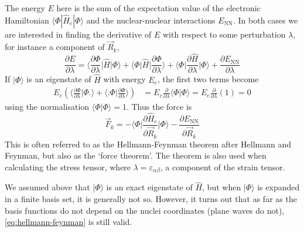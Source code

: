 \documentclass[11pt,bibliography=totoc,index=totoc]{scrbook}   %
\begin{document}
The energy $E$ here is the sum of the expectation value of the electronic Hamiltonian $\langle\Phi|\hat{H}_e|\Phi\rangle$ and the nuclear-nuclear interactions $E_{\text{NN}}$.
In both cases we are interested in finding the derivative of $E$ with respect to some perturbation $\lambda$, for instance a component of $\vec{R}_k$,
\begin{equation}
    \frac{\partial E}{\partial\lambda} 
  = \biggl\langle \frac{\partial\Phi}{\partial\lambda} \biggl| \hat{H} \biggr| \Phi \biggr\rangle
  + \biggl\langle \Phi \biggl| \hat{H} \biggr| \frac{\partial\Phi}{\partial\lambda} \biggr\rangle
  + \biggl\langle \Phi \biggl| \frac{\partial\hat{H}}{\partial\lambda} \biggr| \Phi \biggr\rangle
  + \frac{\partial E_{\text{NN}}}{\partial\lambda}
\end{equation}
If $|\Phi\rangle$ is an eigenstate of $\hat{H}$ with energy $E_e$, the first two terms become
\begin{align}
  E_e \left (\biggl\langle \frac{\partial\Phi}{\partial\lambda} \biggl| \Phi \biggr. \biggr\rangle
  + \biggl\langle\biggl. \Phi \biggr| \frac{\partial\Phi}{\partial\lambda} \biggr\rangle \right) 
  &= E_e \frac{\partial}{\partial\lambda} \langle \Phi | \Phi \rangle 
  = E_e \frac{\partial}{\partial\lambda} (1) = 0
\end{align}
using the normalisation $\langle\Phi|\Phi\rangle=1$. Thus the force is
\begin{equation}
    \vec{F}_k = - \biggl\langle \Phi \biggl| \frac{\partial\hat{H}_e}{\partial\vec{R}_k} \biggr| \Phi \biggr\rangle - \frac{\partial E_{\text{NN}}}{\partial\vec{R}_k}
  \label{eq:hellmann-feynman}
\end{equation}
This is often referred to as the Hellmann-Feynman theorem after Hellmann\cite{Hellmann:1937} 
and Feynman\cite{Feynman:1939}, but also as the `force theorem'.\cite[56]{Martin:2004} 
The theorem is also used when calculating the stress tensor, where $\lambda=\varepsilon_{\alpha\beta}$, a component of the strain tensor.

We assumed above that $|\Phi\rangle$ is an exact eigenstate of $\hat{H}$, but when $|\Phi\rangle$ is expanded in a finite basis set, it is generally not so.
However, it turns out that as far as the basis functions do not depend on the nuclei coordinates (plane waves do not), \eqref{eq:hellmann-feynman} is still valid.\cite[see e.g.][p. 557]{Kantorovich:2004}

\end{document}
